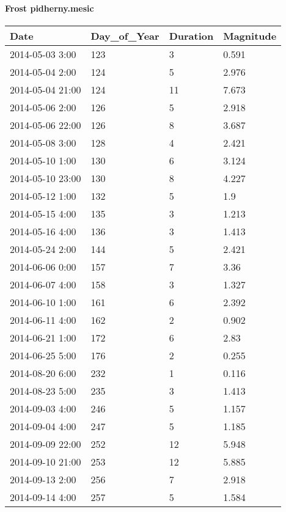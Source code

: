 \documentclass[
]{article}
\begin{document}
\hypertarget{frost-pidherny.mesic}{%
\paragraph{Frost pidherny.mesic}\label{frost-pidherny.mesic}}

\begin{tabular}{l|l|l|l}
\hline
Date & Day\_of\_Year & Duration & Magnitude\\
\hline
2014-05-03 3:00 & 123 & 3 & 0.591\\
\hline
2014-05-04 2:00 & 124 & 5 & 2.976\\
\hline
2014-05-04 21:00 & 124 & 11 & 7.673\\
\hline
2014-05-06 2:00 & 126 & 5 & 2.918\\
\hline
2014-05-06 22:00 & 126 & 8 & 3.687\\
\hline
2014-05-08 3:00 & 128 & 4 & 2.421\\
\hline
2014-05-10 1:00 & 130 & 6 & 3.124\\
\hline
2014-05-10 23:00 & 130 & 8 & 4.227\\
\hline
2014-05-12 1:00 & 132 & 5 & 1.9\\
\hline
2014-05-15 4:00 & 135 & 3 & 1.213\\
\hline
2014-05-16 4:00 & 136 & 3 & 1.413\\
\hline
2014-05-24 2:00 & 144 & 5 & 2.421\\
\hline
2014-06-06 0:00 & 157 & 7 & 3.36\\
\hline
2014-06-07 4:00 & 158 & 3 & 1.327\\
\hline
2014-06-10 1:00 & 161 & 6 & 2.392\\
\hline
2014-06-11 4:00 & 162 & 2 & 0.902\\
\hline
2014-06-21 1:00 & 172 & 6 & 2.83\\
\hline
2014-06-25 5:00 & 176 & 2 & 0.255\\
\hline
2014-08-20 6:00 & 232 & 1 & 0.116\\
\hline
2014-08-23 5:00 & 235 & 3 & 1.413\\
\hline
2014-09-03 4:00 & 246 & 5 & 1.157\\
\hline
2014-09-04 4:00 & 247 & 5 & 1.185\\
\hline
2014-09-09 22:00 & 252 & 12 & 5.948\\
\hline
2014-09-10 21:00 & 253 & 12 & 5.885\\
\hline
2014-09-13 2:00 & 256 & 7 & 2.918\\
\hline
2014-09-14 4:00 & 257 & 5 & 1.584\\

\end{tabular}
\end{document}
